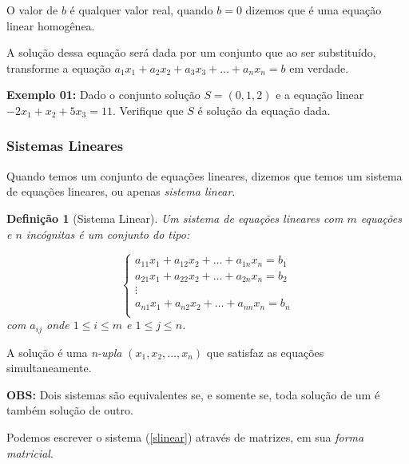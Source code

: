 \documentclass[oneside,a4paper,12pt]{article}
\newtheorem{definition}{Definição}[section]
\begin{document}
O valor de $b$ é qualquer valor real, quando $b=0$ dizemos que é uma equação linear homogênea.

A solução dessa equação será dada por um conjunto que ao ser substituído, transforme a equação $a_1x_1+a_2x_2+a_3x_3+\dots+a_nx_n=b$ em verdade.

\textbf{Exemplo 01: }Dado o conjunto solução $S = (0,1,2)$ e a equação linear $-2x_1+x_2+5x_3=11$. Verifique que $S$ é solução da equação dada.

\vspace{100pt}

\subsubsection{Sistemas Lineares}

Quando temos um conjunto de equações lineares, dizemos que temos um sistema de equações lineares, ou apenas {\it sistema linear}.

\begin{definition}[Sistema Linear]
	Um sistema de equações lineares com $m$ equações e $n$ incógnitas é um conjunto do tipo:
	
	\begin{equation}\label{slinear}
	\left\{
	 \begin{array}{c}
	 a_{11}x_1 + a_{12}x_2 + \ldots + a_{1n}x_n=b_1 \\
	 a_{21}x_1 + a_{22}x_2 + \ldots + a_{2n}x_n=b_2 \\
	 \vdots \\
	 a_{n1}x_1 + a_{n2}x_2 + \ldots + a_{nn}x_n=b_n \\
	 \end{array}
	 \right.
	\end{equation}	 
com $a_{ij}$ onde $1 \leq i \leq m$ e $1 \leq j \leq n$.
\end{definition}

A solução é uma {\it n-upla} $(x_1,x_2,\dots,x_n)$ que satisfaz as equações simultaneamente.

\textbf{OBS:} Dois sistemas são equivalentes se, e somente se, toda solução de um é também solução de outro.

Podemos escrever o sistema  (\ref{slinear}) através de matrizes, em sua {\it forma matricial}.
\end{document}
